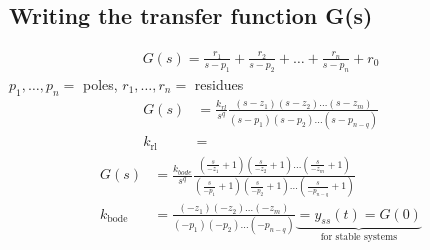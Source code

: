 \subsection{Writing the transfer function G(s)}
        \begin{align*}
            G(s) = \frac{r_1}{s-p_1} + \frac{r_2}{s-p_2} + \ldots + \frac{r_n}{s-p_n} + r_0
        \end{align*}
        $p_1, \ldots, p_n =$ poles, $r_1, \ldots, r_n =$ residues
        \begin{align*}
            G(s) &= \frac{k_{rl}}{s^q} \frac{(s-z_1)(s-z_2) \dots (s-z_m)}{(s-p_1)(s-p_2) \dots (s-p_{n-q})}\\
            k_{\text{rl}} &= 
        \end{align*}
        \begin{align*}
            G(s) &= \frac{k_{bode}}{s^q} \frac{(\frac{s}{-z_1} + 1)(\frac{s}{-z_2} + 1) \dots (\frac{s}{-z_m} + 1)}{(\frac{s}{-p_1} + 1)(\frac{s}{-p_2} + 1) \dots (\frac{s}{-p_{n-q}} + 1)}\\
            k_{\text{bode}} &= \frac{(-z_1)(-z_2) \dots (-z_m)}{(-p_1)(-p_2) \dots (-p_{n-q})} \underbrace{= y_{ss}(t) = G(0)}_{\text{for stable systems}}
        \end{align*}